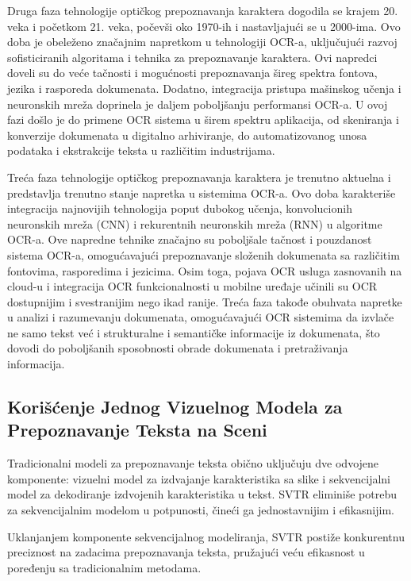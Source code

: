 \documentclass[a4paper,12pt]{article}
\begin{document}
	Druga faza tehnologije optičkog prepoznavanja karaktera dogodila se krajem 20. veka i početkom 21. veka, počevši oko 1970-ih i nastavljajući se u 2000-ima. Ovo doba je obeleženo značajnim napretkom u tehnologiji OCR-a, uključujući razvoj sofisticiranih algoritama i tehnika za prepoznavanje karaktera. Ovi napredci doveli su do veće tačnosti i mogućnosti prepoznavanja šireg spektra fontova, jezika i rasporeda dokumenata. Dodatno, integracija pristupa mašinskog učenja i neuronskih mreža doprinela je daljem poboljšanju performansi OCR-a. U ovoj fazi došlo je do primene OCR sistema u širem spektru aplikacija, od skeniranja i konverzije dokumenata u digitalno arhiviranje, do automatizovanog unosa podataka i ekstrakcije teksta u različitim industrijama.
	
	Treća faza tehnologije optičkog prepoznavanja karaktera je trenutno aktuelna i predstavlja trenutno stanje napretka u sistemima OCR-a. Ovo doba karakteriše integracija najnovijih tehnologija poput dubokog učenja, konvolucionih neuronskih mreža (CNN) i rekurentnih neuronskih mreža (RNN) u algoritme OCR-a. Ove napredne tehnike značajno su poboljšale tačnost i pouzdanost sistema OCR-a, omogućavajući prepoznavanje složenih dokumenata sa različitim fontovima, rasporedima i jezicima. Osim toga, pojava OCR usluga zasnovanih na cloud-u i integracija OCR funkcionalnosti u mobilne uređaje učinili su OCR dostupnijim i svestranijim nego ikad ranije. Treća faza takođe obuhvata napretke u analizi i razumevanju dokumenata, omogućavajući OCR sistemima da izvlače ne samo tekst već i strukturalne i semantičke informacije iz dokumenata, što dovodi do poboljšanih sposobnosti obrade dokumenata i pretraživanja informacija.

	\subsection{Korišćenje Jednog Vizuelnog Modela za Prepoznavanje Teksta na Sceni}
	
	Tradicionalni modeli za prepoznavanje teksta obično uključuju dve odvojene komponente: vizuelni model za izdvajanje karakteristika sa slike i sekvencijalni model za dekodiranje izdvojenih karakteristika u tekst. SVTR eliminiše potrebu za sekvencijalnim modelom u potpunosti, čineći ga jednostavnijim i efikasnijim.
	
	Uklanjanjem komponente sekvencijalnog modeliranja, SVTR postiže konkurentnu preciznost na zadacima prepoznavanja teksta, pružajući veću efikasnost u poređenju sa tradicionalnim metodama.
	
\end{document}
